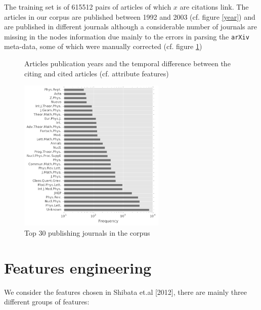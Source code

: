 \documentclass{acmsiggraph}
\begin{document}
The training set is of 615512 pairs of articles of which $x$ are citations link.
The articles in our corpus are published between 1992 and 2003 (cf. figure \ref{year}) and are published in different journals although a considerable number of journals are missing in the nodes information due mainly to the errors in parsing the \texttt{arXiv} meta-data, some of which were manually corrected (cf. figure \ref{jrn})
\begin{figure}[H]
\centering
{}
\caption{Articles publication years and the temporal difference between the citing and cited articles (cf. attribute features)}
\end{figure}
\begin{figure}[H]
\centering
\includegraphics[width=7cm]{articles_journals}
\caption{Top 30 publishing journals in the corpus\label{jrn}}
\end{figure}
\section{Features engineering}
We consider the features chosen in Shibata et.al [2012], there are mainly three different groups of features: 
\end{document}

